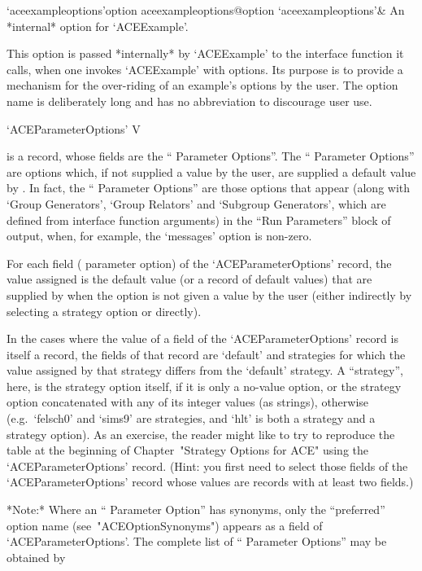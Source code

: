 \>`aceexampleoptions'{option aceexampleoptions}@{option `aceexampleoptions'}&
An *internal* option for `ACEExample'.

This option is passed  *internally*  by  `ACEExample'  to  the  {\ACE}
interface function  it  calls,  when  one  invokes  `ACEExample'  with
options. Its purpose is to provide a mechanism for the over-riding  of
an example's options by the user. The option name is deliberately long
and has no abbreviation to discourage user use.

\enditems

\nolabel

\>`ACEParameterOptions' V

is a {\GAP} record, whose fields are the ``{\ACE} Parameter Options''.
The ``{\ACE} Parameter Options'' are options which, if not supplied  a
value by the user, are supplied a default value by  {\ACE}.  In  fact,
the ``{\ACE} Parameter Options'' are those options that appear  (along
with `Group Generators', `Group Relators' and  `Subgroup  Generators',
which are defined from {\ACE} interface  function  arguments)  in  the
``Run Parameters'' block of {\ACE}  output,  when,  for  example,  the
`messages' option is non-zero.

For each field ({\ACE} parameter option) of the  `ACEParameterOptions'
record, the value assigned is  the  default  value  (or  a  record  of
default values) that are supplied by {\ACE} when  the  option  is  not
given a value by the user (either indirectly by selecting  a  strategy
option or directly).

In the cases where the value of a field of  the  `ACEParameterOptions'
record is itself a record, the fields of that record are `default' and
strategies for which the value assigned by that strategy differs  from
the `default' strategy. A ``strategy'', here, is the  strategy  option
itself, if it is only  a  no-value  option,  or  the  strategy  option
concatenated with any of its integer values  (as  strings),  otherwise
(e.g.~`felsch0' and `sims9'  are  strategies,  and  `hlt'  is  both  a
strategy and a strategy option). As an exercise, the reader might like
to try to reproduce the table at the  beginning  of  Chapter~"Strategy
Options for ACE" using the `ACEParameterOptions'  record.  (Hint:  you
first need to select those fields of the `ACEParameterOptions'  record
whose values are records with at least two fields.)

*Note:*
Where  an  ``{\ACE}  Parameter  Option''  has   synonyms,   only   the
``preferred'' option name (see~"ACEOptionSynonyms") appears as a field
of `ACEParameterOptions'. The  complete  list  of  ``{\ACE}  Parameter
Options'' may be obtained by

